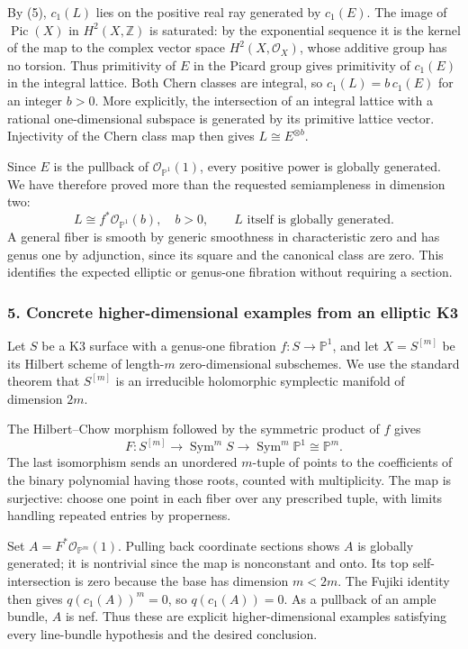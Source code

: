 \documentclass[11pt]{article}
\begin{document}
By (5), $c_1(L)$ lies on the positive real ray generated by $c_1(E)$. The image of $\operatorname{Pic}(X)$ in $H^2(X,\mathbb Z)$ is saturated: by the exponential sequence it is the kernel of the map to the complex vector space $H^2(X,\mathcal O_X)$, whose additive group has no torsion. Thus primitivity of $E$ in the Picard group gives primitivity of $c_1(E)$ in the integral lattice. Both Chern classes are integral, so $c_1(L)=b\,c_1(E)$ for an integer $b>0$. More explicitly, the intersection of an integral lattice with a rational one-dimensional subspace is generated by its primitive lattice vector. Injectivity of the Chern class map then gives $L\cong E^{\otimes b}$.

Since $E$ is the pullback of $\mathcal O_{\mathbb P^1}(1)$, every positive power is globally generated. We have therefore proved more than the requested semiampleness in dimension two:
\[
 L\cong f^*\mathcal O_{\mathbb P^1}(b),\quad b>0,
 \qquad L\text{ itself is globally generated}.        \tag{7}
\]
A general fiber is smooth by generic smoothness in characteristic zero and has genus one by adjunction, since its square and the canonical class are zero. This identifies the expected elliptic or genus-one fibration without requiring a section.

\subsubsection{5. Concrete higher-dimensional examples from an elliptic K3}
Let $S$ be a K3 surface with a genus-one fibration $f:S\to\mathbb P^1$, and let $X=S^{[m]}$ be its Hilbert scheme of length-$m$ zero-dimensional subschemes. We use the standard theorem that $S^{[m]}$ is an irreducible holomorphic symplectic manifold of dimension $2m$.

The Hilbert--Chow morphism followed by the symmetric product of $f$ gives
\[
 F:S^{[m]}\longrightarrow\operatorname{Sym}^mS
 \longrightarrow\operatorname{Sym}^m\mathbb P^1\cong\mathbb P^m.
\]
The last isomorphism sends an unordered $m$-tuple of points to the coefficients of the binary polynomial having those roots, counted with multiplicity. The map is surjective: choose one point in each fiber over any prescribed tuple, with limits handling repeated entries by properness.

Set $A=F^*\mathcal O_{\mathbb P^m}(1)$. Pulling back coordinate sections shows $A$ is globally generated; it is nontrivial since the map is nonconstant and onto. Its top self-intersection is zero because the base has dimension $m<2m$. The Fujiki identity then gives $q(c_1(A))^m=0$, so $q(c_1(A))=0$. As a pullback of an ample bundle, $A$ is nef. Thus these are explicit higher-dimensional examples satisfying every line-bundle hypothesis and the desired conclusion.
\end{document}

